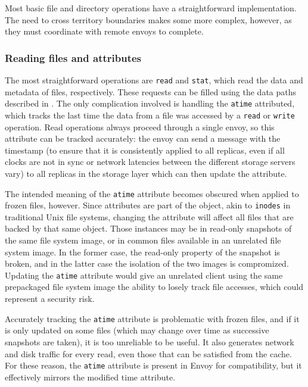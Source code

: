 Most basic file and directory operations have a straightforward implementation. The need to cross territory boundaries makes some more complex, however, as they must coordinate with remote envoys to complete.

\subsubsection{Reading files and attributes}

The most straightforward operations are \texttt{read} and \texttt{stat}, which read the data and metadata of files, respectively. These requests can be filled using the data paths described in . The only complication involved is handling the \texttt{atime} attributed, which tracks the last time the data from a file was accessed by a \texttt{read} or \texttt{write} operation. Read operations always proceed through a single envoy, so this attribute can be tracked accurately: the envoy can send a message with the timestamp (to ensure that it is consistently applied to all replicas, even if all clocks are not in sync or network latencies between the different storage servers vary) to all replicas in the storage layer which can then update the attribute.

The intended meaning of the \texttt{atime} attribute becomes obscured when applied to frozen files, however. Since attributes are part of the object, akin to \texttt{inodes} in traditional Unix file systems, changing the attribute will affect all files that are backed by that same object. Those instances may be in read-only snapshots of the same file system image, or in common files available in an unrelated file system image. In the former case, the read-only property of the snapshot is broken, and in the latter case the isolation of the two images is compromized. Updating the \texttt{atime} attribute would give an unrelated client using the same prepackaged file system image the ability to losely track file accesses, which could represent a security risk.

Accurately tracking the \texttt{atime} attribute is problematic with frozen files, and if it is only updated on some files (which may change over time as successive snapshots are taken), it is too unreliable to be useful. It also generates network and disk traffic for every read, even those that can be satisfied from the cache. For these reason, the \texttt{atime} attribute is present in Envoy for compatibility, but it effectively mirrors the modified time attribute.

